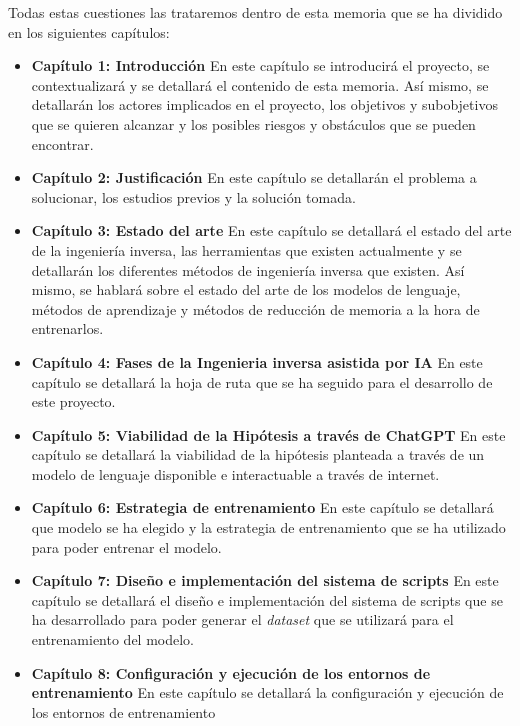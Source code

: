 Todas estas cuestiones las trataremos dentro de esta memoria que se ha dividido en los
siguientes capítulos:

\begin{itemize}
    \item \textbf{Capítulo 1: Introducción} En este capítulo se introducirá el proyecto,
        se contextualizará y se detallará el contenido de esta memoria. Así mismo, se
        detallarán los actores implicados en el proyecto, los objetivos y subobjetivos
        que se quieren alcanzar y los posibles riesgos y obstáculos que se pueden encontrar.
    \item \textbf{Capítulo 2: Justificación} En este capítulo se detallarán el problema
        a solucionar, los estudios previos y la solución tomada.
    \item \textbf{Capítulo 3: Estado del arte} En este capítulo se detallará el estado
        del arte de la ingeniería inversa, las herramientas que existen actualmente y
        se detallarán los diferentes métodos de ingeniería inversa que existen. Así mismo,
        se hablará sobre el estado del arte de los modelos de lenguaje, métodos de aprendizaje
        y métodos de reducción de memoria a la hora de entrenarlos.
    \item \textbf{Capítulo 4: Fases de la Ingenieria inversa asistida por IA} En este
        capítulo se detallará la hoja de ruta que se ha seguido para el desarrollo de este
        proyecto.
    \item \textbf{Capítulo 5: Viabilidad de la Hipótesis a través de ChatGPT} En este capítulo
        se detallará la viabilidad de la hipótesis planteada a través de un modelo de lenguaje
        disponible e interactuable a través de internet.
    \item \textbf{Capítulo 6: Estrategia de entrenamiento} En este capítulo se detallará que
        modelo se ha elegido y la estrategia de entrenamiento que se ha utilizado para poder 
        entrenar el modelo.
    \item \textbf{Capítulo 7: Diseño e implementación del sistema de scripts} En este
        capítulo se detallará el diseño e implementación del sistema de scripts que se
        ha desarrollado para poder generar el \textit{dataset} que se utilizará para el
        entrenamiento del modelo.
    \item \textbf{Capítulo 8: Configuración y ejecución de los entornos de entrenamiento} En
        este capítulo se detallará la configuración y ejecución de los entornos de entrenamiento

\end{itemize}
